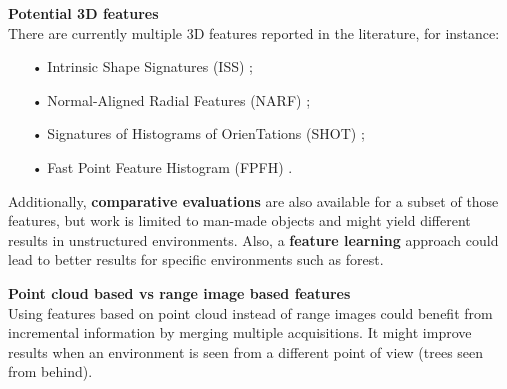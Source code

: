 \documentclass[a0paper,portrait]{baposter}
\begin{document}
\begin{poster}
{        \textbf{Potential 3D features}\\
        There are currently multiple 3D features reported in the literature, for instance:
        \begin{itemize}
            \item[•] Intrinsic Shape Signatures (ISS) \cite{Yu2009};
            \item[•] Normal-Aligned Radial Features (NARF) \cite{Steder2011};
            \item[•] Signatures of Histograms of OrienTations (SHOT) \cite{Tombari2010};
            \item[•] Fast Point Feature Histogram (FPFH) \cite{Rusu2009}.
        \end{itemize}
        Additionally, \textbf{comparative evaluations} \cite{Boyer2011} \cite{Filipe2014} are also available for a subset of those features, but work is limited to man-made objects and might yield different results in unstructured environments. Also, a \textbf{feature learning} approach could lead to better results for specific environments such as forest.\vspace{1em}

        \textbf{Point cloud based vs range image based features}\\
        Using features based on point cloud instead of range images could benefit from incremental information by merging multiple acquisitions. It might improve results when an environment is seen from a different point of view (trees seen from behind).
    }

\end{poster}
\end{document}
